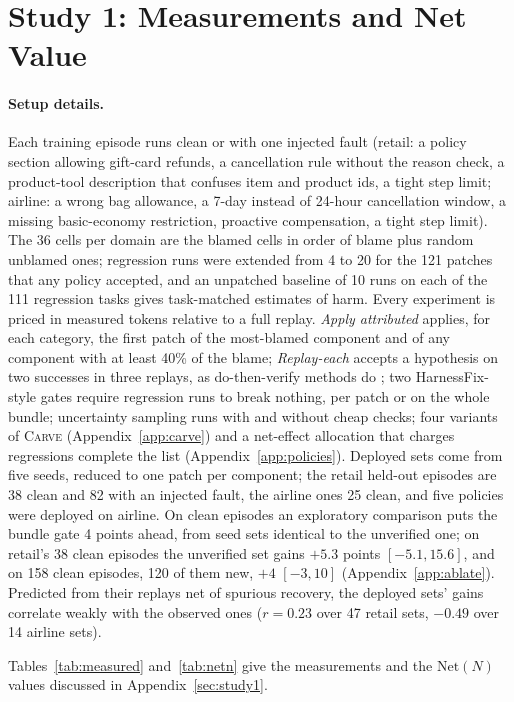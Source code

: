 \documentclass[11pt]{article}
\newcommand{\carve}{\textsc{Carve}}
\begin{document}
\section{Study 1: Measurements and Net Value}
\label{app:s1tables}
\paragraph{Setup details.} Each training episode runs clean or with one injected fault (retail: a policy section allowing gift-card refunds, a cancellation rule without the reason check, a product-tool description that confuses item and product ids, a tight step limit; airline: a wrong bag allowance, a 7-day instead of 24-hour cancellation window, a missing basic-economy restriction, proactive compensation, a tight step limit). The 36 cells per domain are the blamed cells in order of blame plus random unblamed ones; regression runs were extended from 4 to 20 for the 121 patches that any policy accepted, and an unpatched baseline of 10 runs on each of the 111 regression tasks gives task-matched estimates of harm. Every experiment is priced in measured tokens relative to a full replay. \emph{Apply attributed} applies, for each category, the first patch of the most-blamed component and of any component with at least 40\% of the blame; \emph{Replay-each} accepts a hypothesis on two successes in three replays, as do-then-verify methods do \citep{ma2025dover}; two HarnessFix-style gates require regression runs to break nothing, per patch or on the whole bundle; uncertainty sampling runs with and without cheap checks; four variants of \carve{} (Appendix~\ref{app:carve}) and a net-effect allocation that charges regressions complete the list (Appendix~\ref{app:policies}). Deployed sets come from five seeds, reduced to one patch per component; the retail held-out episodes are 38 clean and 82 with an injected fault, the airline ones 25 clean, and five policies were deployed on airline. On clean episodes an exploratory comparison puts the bundle gate 4 points ahead, from seed sets identical to the unverified one; on retail's 38 clean episodes the unverified set gains $+5.3$ points $[-5.1,15.6]$, and on 158 clean episodes, 120 of them new, $+4$ $[-3,10]$ (Appendix~\ref{app:ablate}). Predicted from their replays net of spurious recovery, the deployed sets' gains correlate weakly with the observed ones ($r=0.23$ over 47 retail sets, $-0.49$ over 14 airline sets).

Tables~\ref{tab:measured} and~\ref{tab:netn} give the measurements and the $\mathrm{Net}(N)$ values discussed in Appendix~\ref{sec:study1}.
\end{document}
